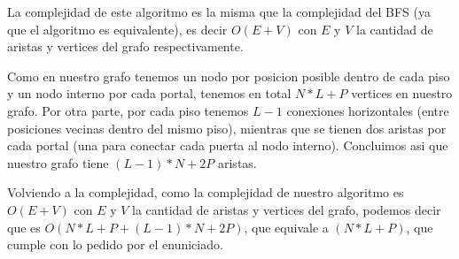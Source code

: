 La complejidad de este algoritmo es la misma que la complejidad del BFS (ya que el algoritmo es equivalente), es decir $O(E + V)$ con $E$ y $V$ la cantidad de aristas y vertices del grafo respectivamente.

Como en nuestro grafo tenemos un nodo por posicion posible dentro de cada piso y un nodo interno por cada portal, tenemos en total $N * L + P$ vertices en nuestro grafo. Por otra parte, por cada piso tenemos $L-1$ conexiones horizontales (entre posiciones vecinas dentro del mismo piso), mientras que se tienen dos aristas por cada portal (una para conectar cada puerta al nodo interno). Concluimos asi que nuestro grafo tiene $(L-1) * N + 2P$ aristas.

Volviendo a la complejidad, como la complejidad de nuestro algoritmo es $O(E + V)$ con $E$ y $V$ la cantidad de aristas y vertices del grafo, podemos decir que es $O(N * L + P + (L-1) * N + 2P)$, que equivale a $(N * L + P)$, que cumple con lo pedido por el enuniciado.